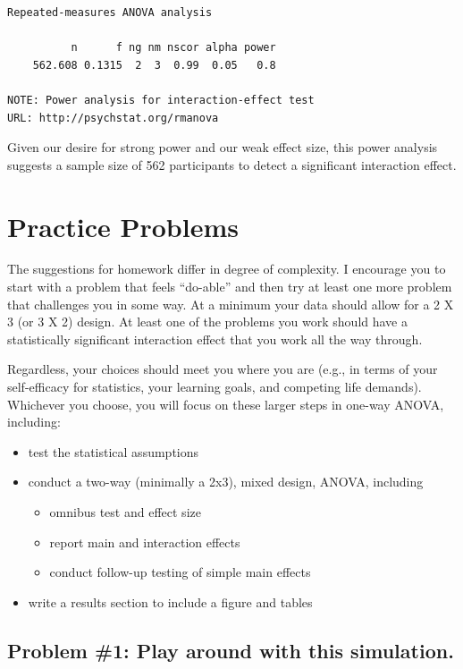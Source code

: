 \documentclass[
  11pt,
]{book}
\providecommand{\tightlist}{%
  \setlength{\itemsep}{0pt}\setlength{\parskip}{0pt}}
\begin{document}
\begin{verbatim}
Repeated-measures ANOVA analysis

          n      f ng nm nscor alpha power
    562.608 0.1315  2  3  0.99  0.05   0.8

NOTE: Power analysis for interaction-effect test
URL: http://psychstat.org/rmanova
\end{verbatim}

Given our desire for strong power and our weak effect size, this power analysis suggests a sample size of 562 participants to detect a significant interaction effect.

\hypertarget{practice-problems-8}{%
\section{Practice Problems}\label{practice-problems-8}}

The suggestions for homework differ in degree of complexity. I encourage you to start with a problem that feels ``do-able'' and then try at least one more problem that challenges you in some way. At a minimum your data should allow for a 2 X 3 (or 3 X 2) design. At least one of the problems you work should have a statistically significant interaction effect that you work all the way through.

Regardless, your choices should meet you where you are (e.g., in terms of your self-efficacy for statistics, your learning goals, and competing life demands). Whichever you choose, you will focus on these larger steps in one-way ANOVA, including:

\begin{itemize}
\tightlist
\item
  test the statistical assumptions
\item
  conduct a two-way (minimally a 2x3), mixed design, ANOVA, including

  \begin{itemize}
  \tightlist
  \item
    omnibus test and effect size
  \item
    report main and interaction effects
  \item
    conduct follow-up testing of simple main effects
  \end{itemize}
\item
  write a results section to include a figure and tables
\end{itemize}

\hypertarget{problem-1-play-around-with-this-simulation.-2}{%
\subsection{Problem \#1: Play around with this simulation.}\label{problem-1-play-around-with-this-simulation.-2}}
\end{document}

